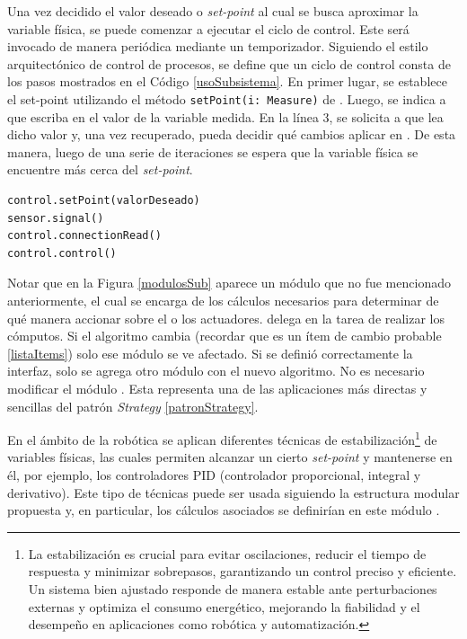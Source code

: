 Una vez decidido el valor deseado o \textit{set-point} al cual se busca aproximar la variable física, se puede comenzar a ejecutar el ciclo de control. Este será invocado de manera periódica mediante un temporizador. Siguiendo el estilo arquitectónico de control de procesos, se define que un ciclo de control consta de los pasos mostrados en el Código \ref{usoSubsistema}. En primer lugar, se establece el set-point utilizando el método \verb|setPoint(i: Measure)| de \Control. Luego, se indica a \Sensor que escriba en \Pipe el valor de la variable medida. En la línea 3, se solicita a \Control que lea dicho valor y, una vez recuperado, pueda decidir qué cambios aplicar en \Actuador. De esta manera, luego de una serie de iteraciones se espera que la variable física se encuentre más cerca del \textit{set-point}.

\begin{lstlisting}[caption=Ejemplo de uso del subsistema.,label={usoSubsistema}]
control.setPoint(valorDeseado)
sensor.signal()
control.connectionRead()
control.control()
\end{lstlisting}

Notar que en la Figura \ref{modulosSub} aparece un módulo que no fue mencionado anteriormente, \Algoritmo el cual se encarga de los cálculos necesarios para determinar de qué manera accionar sobre el o los actuadores. \Control delega en \Algoritmo la tarea de realizar los cómputos. Si el algoritmo cambia (recordar que es un ítem de cambio probable \ref{listaItems}) solo ese módulo se ve afectado. Si se definió correctamente la interfaz, solo se agrega otro módulo con el nuevo algoritmo. No es necesario modificar el módulo \Control. Esta representa una de las aplicaciones más directas y sencillas del patrón \textit{Strategy} \ref{patronStrategy}.

En el ámbito de la robótica se aplican diferentes técnicas de estabilización\footnote{La estabilización es crucial para evitar oscilaciones, reducir el tiempo de respuesta y minimizar sobrepasos, garantizando un control preciso y eficiente. Un sistema bien ajustado responde de manera estable ante perturbaciones externas y optimiza el consumo energético, mejorando la fiabilidad y el desempeño en aplicaciones como robótica y automatización.} de variables físicas, las cuales permiten alcanzar un cierto \textit{set-point} y mantenerse en él, por ejemplo, los controladores \gls{PID}\cite{pidlibro} (controlador proporcional, integral y derivativo). Este tipo de técnicas puede ser usada siguiendo la estructura modular propuesta y, en particular, los cálculos asociados se definirían en este módulo \Algoritmo.

